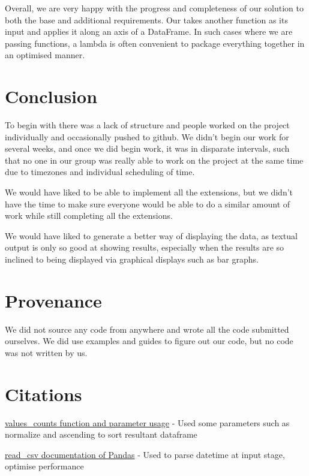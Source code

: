 \documentclass[12pt,a4paper,final]{article}
\begin{document}
Overall, we are very happy with the progress and completeness of our solution to both the base and additional requirements. Our  takes another function as its input and applies it along an axis of a DataFrame.
In such cases where we are passing functions, a lambda is often convenient to package everything together in an optimised manner.

\section*{Conclusion}

To begin with there was a lack of structure and people worked on the project individually and occasionally pushed to github. We didn't begin our work for several weeks, and once we did begin work, it was in disparate intervals, such that no one in our group was really able to work on the project at the same time due to timezones and individual scheduling of time.

We would have liked to be able to implement all the extensions, but we didn't have the time to make sure everyone would be able to do a similar amount of work while still completing all the extensions.

We would have liked to generate a better way of displaying the data, as textual output is only so good at showing results, especially when the results are so inclined to being displayed via graphical displays such as bar graphs.

\section*{Provenance}

We did not source any code from anywhere and wrote all the code submitted ourselves. We did use examples and guides to figure out our code, but no code was not written by us.

\section*{Citations}

\noindent
\href{https://www.w3resource.com/pandas/series/series-value_counts.php}{values\_counts function and parameter usage}
\newline - Used some parameters such as normalize and ascending to sort resultant dataframe

\href{https://pandas.pydata.org/pandas-docs/stable/reference/api/pandas.read_csv.html}{read_csv documentation of Pandas}
\newline - Used to parse datetime at input stage, optimise performance
\end{document}
